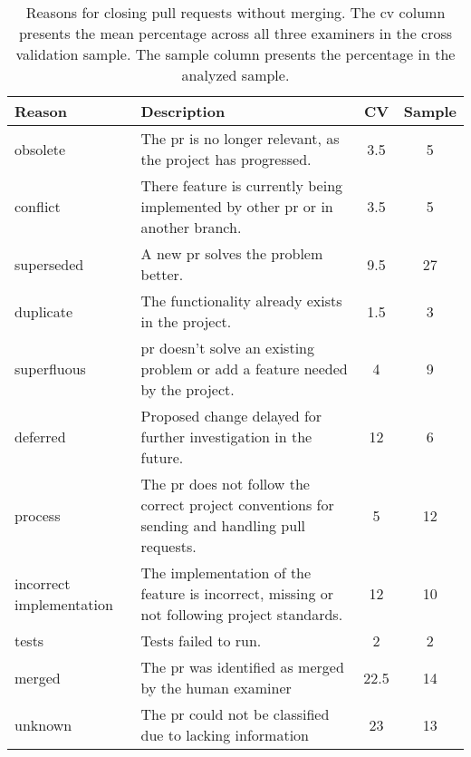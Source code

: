 \documentclass{sig-alternate}
\begin{document}
\begin{table}
  \begin{small}
  \centering
  \begin{tabular}{p{6em}p{14em}cc}
    \hline
    \textbf{Reason} & \textbf{Description} & \textbf{CV} &
    \textbf{Sample}
\\
    \hline
    \textsf{obsolete} &	The {\sc pr} is no longer relevant, as the project
    has progressed. & 3.5 & 5\\

    \textsf{conflict} &	There feature is currently being implemented by other
    {\sc pr} or in another branch. &  3.5 & 5\\

    \textsf{superseded} &	A new {\sc pr} solves the problem better. & 9.5 & 27\\

    \textsf{duplicate} & The functionality already exists in the project. & 1.5 & 3 \\

    \textsf{superfluous} & {\sc pr} doesn't solve an existing problem or add a
    feature needed by the project. & 4 & 9\\

    \textsf{deferred} & Proposed change delayed for further investigation in the
    future. & 12 & 6\\

    \textsf{process} & The {\sc pr} does not follow the correct project
    conventions for sending and handling pull requests. & 5 & 12\\

    \textsf{incorrect implementation} &	The implementation of the feature is
    incorrect, missing or not following project standards. & 12 & 10\\

    \textsf{tests} & Tests failed to run. & 2 & 2\\

    \hline 
    \textsf{merged} & The {\sc pr} was identified as merged by the human
    examiner & 22.5 & 14\\

    \textsf{unknown} & The {\sc pr} could not be classified due to lacking
    information & 23 & 13 \\

    \hline
  \end{tabular}
\end{small}
\caption{Reasons for closing pull requests without merging. The {\sc cv} column
presents the mean percentage across all three examiners in the cross validation sample. The sample column presents the percentage in the analyzed sample.}
\label{tab:unmerged}
\end{table}
\end{document}
